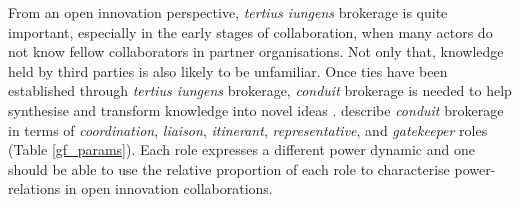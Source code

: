 From an open innovation perspective, \emph{tertius iungens} brokerage is quite important, especially in the early stages of collaboration, when many actors do not know fellow collaborators in partner organisations. Not only that, knowledge held by third parties is also likely to be unfamiliar. Once ties have been established through \emph{tertius iungens} brokerage, \emph{conduit} brokerage is needed to help synthesise and transform knowledge into novel ideas \citep{fleming2007collaborative,lingo2010nexus,quintane2016brokers}. \citet{gould1989structures} describe \emph{conduit} brokerage in terms of \emph{coordination}, \emph{liaison}, \emph{itinerant}, \emph{representative}, and \emph{gatekeeper} roles (Table \ref{gf_params}). Each role expresses a different power dynamic and one should be able to use the relative proportion of each role to characterise power-relations in open innovation collaborations. \medskip

